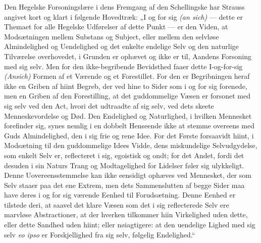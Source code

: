 \documentclass[12pt]{book}
\begin{document}
Den Hegelske Forsoningslære i dens Fremgang af den Schellingske har
Strauss angivet kort og klart i følgende Hovedtræk: „I og for sig
\textit{(an sich)} --- dette er Themaet for alle Hegelske Udførelser
af dette Punkt --- er den Viden, at Modsætningen mellem Substans og
Subject, eller mellem den selvløse Almindelighed og Uendelighed og
det enkelte endelige Selv og den naturlige Tilværelse overhovedet, i
Grunden er ophævet og ikke er til, Aandens Forsoning med sig selv.
Men for den ikke-begribende Bevidsthed faaer dette I-og-for-sig
\textit{(Ansich)} Formen af et Værende og et Forestillet. For den er
Begribningen heraf ikke en Griben af hiint Begreb, der ved hine to
Sider som i og for sig forenede, men en Griben af den Forestilling,
at det guddommelige Væsen er forsonet med sig selv ved den Act,
hvori det udtraadte af sig selv, ved dets skeete Menneskevordelse og
Død. Den Endelighed og Naturlighed, i hvilken Mennesket forefinder
sig, synes nemlig i en dobbelt Henseende ikke at stemme overeens med
Guds Almindelighed, den i sig frie og rene Idee. For det Første
forsaavidt hiint, i Modsætning til den guddommelige Idees Vidde,
dens miskundelige Selvudgydelse, som enkelt Selv er, reflecteret i
sig, egoistisk og ondt; for det Andet, fordi det desuden i sin
Naturs Trang og Modtagelighed for Lidelser føler sig ulykkeligt.
Denne Uovereensstemmelse kan ikke eensidigt ophæves ved Mennesket,
der som Selv staaer paa det ene Extrem, men dets Sammenslutten af
begge Sider maa have deres i og for sig værende Eenhed til
Forudsætning. Denne Eenhed er tilstede deri, at saavel det klare
Væsen som det i sig reflecterede Selv ere marvløse Abstractioner, at
der hverken tilkommer hiin Virkelighed uden dette, eller dette
Sandhed uden hiint; eller nøiagtigere: at den uendelige Lighed med
sig selv \textit{eo ipso} er Forskjellighed fra sig selv, følgelig
Endelighed.“
\end{document}
